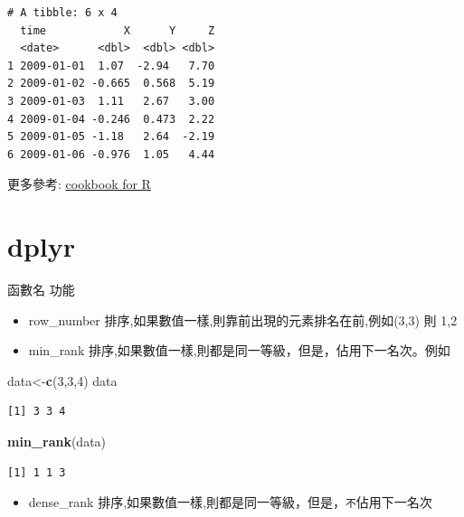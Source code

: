 \documentclass[]{book}
\newenvironment{Shaded}{\begin{snugshade}}{\end{snugshade}}
\newcommand{\DecValTok}[1]{\textcolor[rgb]{0.00,0.00,0.81}{#1}}
\newcommand{\KeywordTok}[1]{\textcolor[rgb]{0.13,0.29,0.53}{\textbf{#1}}}
\newcommand{\NormalTok}[1]{#1}
\providecommand{\tightlist}{%
  \setlength{\itemsep}{0pt}\setlength{\parskip}{0pt}}
\theoremstyle{definition}
\theoremstyle{definition}
\theoremstyle{definition}
\theoremstyle{remark}
\begin{document}
\begin{verbatim}
# A tibble: 6 x 4
  time            X      Y     Z
  <date>      <dbl>  <dbl> <dbl>
1 2009-01-01  1.07  -2.94   7.70
2 2009-01-02 -0.665  0.568  5.19
3 2009-01-03  1.11   2.67   3.00
4 2009-01-04 -0.246  0.473  2.22
5 2009-01-05 -1.18   2.64  -2.19
6 2009-01-06 -0.976  1.05   4.44
\end{verbatim}

更多參考:
\href{http://www.cookbook-r.com/Manipulating_data/Converting_data_between_wide_and_long_format/}{cookbook
for R}

\hypertarget{dplyr}{%
\section{dplyr}\label{dplyr}}

函數名 功能

\begin{itemize}
\item
  row\_number 排序,如果數值一樣,則靠前出現的元素排名在前,例如(3,3) 則
  1,2
\item
  min\_rank 排序,如果數值一樣,則都是同一等級，但是，佔用下一名次。例如
\end{itemize}

\begin{Shaded}
\begin{Highlighting}[]
\NormalTok{data<-}\KeywordTok{c}\NormalTok{(}\DecValTok{3}\NormalTok{,}\DecValTok{3}\NormalTok{,}\DecValTok{4}\NormalTok{)  }
\NormalTok{data}
\end{Highlighting}
\end{Shaded}

\begin{verbatim}
[1] 3 3 4
\end{verbatim}

\begin{Shaded}
\begin{Highlighting}[]
\KeywordTok{min_rank}\NormalTok{(data)}
\end{Highlighting}
\end{Shaded}

\begin{verbatim}
[1] 1 1 3
\end{verbatim}

\begin{itemize}
\tightlist
\item
  dense\_rank
  排序,如果數值一樣,則都是同一等級，但是，\texttt{不}佔用下一名次
\end{itemize}
\end{document}
